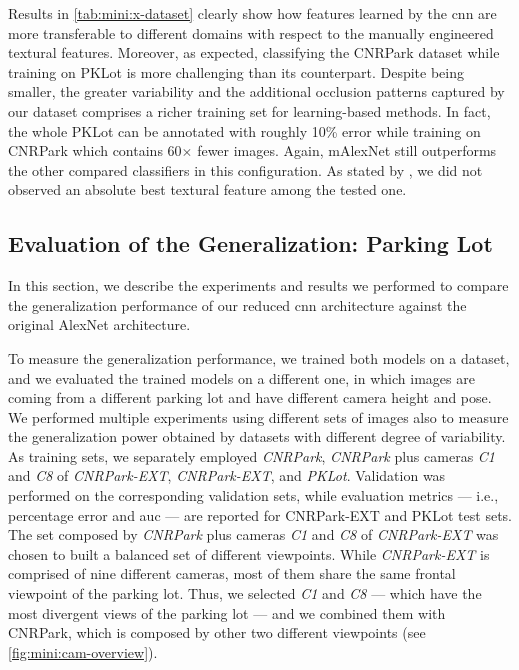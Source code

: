 Results in \ref{tab:mini:x-dataset} clearly show how features learned by the \gls{cnn} are more transferable to different domains with respect to the manually engineered textural features.
Moreover, as expected, classifying the CNRPark dataset while training on PKLot is more challenging than its counterpart.
Despite being smaller, the greater variability and the additional occlusion patterns captured by our dataset comprises a richer training set for learning-based methods.
In fact, the whole PKLot can be annotated with roughly 10\% error while training on CNRPark which contains 60$\times$ fewer images.
Again, mAlexNet still outperforms the other compared classifiers in this configuration.
As stated by \citet{de2015pklot}, we did not observed an absolute best textural feature among the tested one.


\subsection{Evaluation of the Generalization: Parking Lot}
\label{subsec:mini:generalization}

In this section, we describe the experiments and results we performed to compare the generalization performance of our reduced \gls{cnn} architecture against the original AlexNet architecture.

To measure the generalization performance, we trained both models on a dataset, and we evaluated the trained models on a different one, in which images are coming from a different parking lot and have different camera height and pose.
We performed multiple experiments using different sets of images also to measure the generalization power obtained by datasets with different degree of variability.
As training sets, we separately employed \emph{CNRPark}, \emph{CNRPark} plus cameras \emph{C1} and \emph{C8} of \emph{CNRPark-EXT}, \emph{CNRPark-EXT}, and \emph{PKLot}.
Validation was performed on the corresponding validation sets, while evaluation metrics --- i.e., percentage error and \gls{auc} --- are reported for CNRPark-EXT and PKLot test sets.
The set composed by \emph{CNRPark} plus cameras \emph{C1} and \emph{C8} of \emph{CNRPark-EXT} was chosen to built a balanced set of different viewpoints.
While \emph{CNRPark-EXT} is comprised of nine different cameras, most of them share the same frontal viewpoint of the parking lot.
Thus, we selected \emph{C1} and \emph{C8} --- which have the most divergent views of the parking lot --- and we combined them with CNRPark, which is composed by other two different viewpoints (see \ref{fig:mini:cam-overview}).

